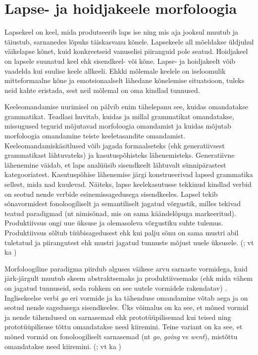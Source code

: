 \documentclass[12pt]{article}
\begin{document}
\newpage
\section{Lapse- ja hoidjakeele morfoloogia}

Lapsekeel on keel, mida produtseerib laps ise ning mis aja jooksul muutub ja täiustub, sarnanedes lõpuks täiskasvanu kõnele. Lapsekeele all mõeldakse üldjuhul väikelapse kõnet, kuid konkreetseid vanuselisi piiranguid pole seatud. Hoidjakeel on lapsele suunatud keel ehk sisendkeel- või kõne. Lapse- ja hoidjakeelt võib vaadelda kui suulise keele allkeeli. Ehkki mõlemale keelele on iseloomulik mitteformaalne kõne ja emotsionaalselt lähedane kõnelemise situatsioon, tuleks neid kahte eristada, sest neil mõlemal on oma kindlad tunnused. \citep[178--181]{Korgesaar}


Keeleomandamise uurimisel on pälvib enim tähelepanu see, kuidas omandatakse grammatikat. Teadlasi huvitab, kuidas ja millal grammatikat omandatakse, missugused tegurid mõjutavad morfoloogia omandamist ja kuidas mõjutab morfoloogia omandamine teiste keeletasandite omandamist. \citep[10]{ARGUSdiss} Keeleomandamiskäsitlused võib jagada formaalseteks (ehk generatiivsest grammatikast lähtuvateks) ja kasutuspõhisteks lähenemisteks. Generatiivne lähenemine väidab, et laps analüüsib sisendkeelt lähtuvalt sünnipärastest kategooriatest. Kasutuspõhise lähenemise järgi konstrueerivad lapsed grammatika sellest, mida nad kuulevad. Näiteks, lapse keelekasutusse tekkinud kindlad verbid on seotud nende verbide esinemissagedusega sisendkeeles. Lapsel tekib sõnavormidest fonoloogiliselt ja semantiliselt jagatud võrgustik, milles tekivad teatud paradigmad (nt nimisõnad, mis on sama käändelõpuga markeeritud). Produktiivsus ongi uue üksuse ja olemasoleva võrgustiku suhte tulemus. Produktiivsus sõltub tüübisagedusest ehk kui palju sõnu on sama mustri abil tuletatud ja piirangutest ehk mustri jagatud tunnuste mõjust uuele üksusele. (\citealp[2546--2547, 2550]{LIEVEN}; vt ka \citealp{Poola})

Morfoloogiline paradigma piirdub alguses väikese arvu sarnaste vormidega, kuid järk-järgult muutub skeem abstraktsemaks ja produktiivsemaks (ehk mida vähem on jagatud tunnuseid, seda rohkem on see uutele vormidele rakendatav) \citep[2549]{LIEVEN}. Inglisekeelse verbi \emph{go} eri vormide ja ka tähenduse omandamine võtab aega ja on seotud nende sagedusega sisendkeeles. Üks võimalus on ka see, et mõned vormid ja nende tähendused on sarnasemad ehk prototüüpilisemad kui teised ning prototüüpilisuse tõttu omandatakse need kiiremini. Teine variant on ka see, et mõned vormid on fonoloogiliselt sarnasemad (nt \emph{go}, \emph{going} vs \emph{went}), mistõttu omandatakse need kiiremini. (\citealp{Theakston}; vt ka \citealp{Hispaania})
\end{document}
